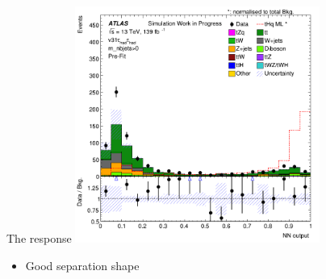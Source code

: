 \begin{frame}{The response}
  \centering \includegraphics[width=0.6\textwidth]{response_binary}
  \begin{itemize}
    \item Good separation shape
  \end{itemize}
\end{frame}
